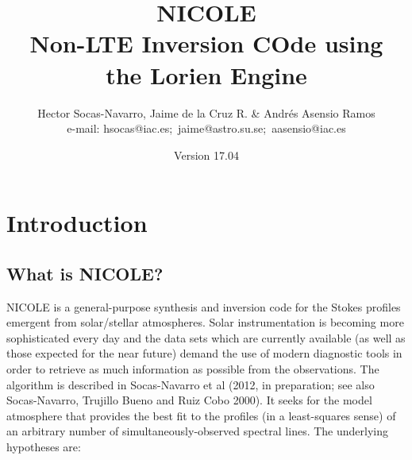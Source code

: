 

\title{NICOLE \\
Non-LTE Inversion COde using \\
the Lorien Engine}

\author{Hector Socas-Navarro,
    Jaime de la Cruz R. \& Andr\'es Asensio Ramos \\
%
e-mail: \mbox{hsocas@iac.es; jaime@astro.su.se; aasensio@iac.es}\\
}

\date{Version 17.04}

\maketitle


\tableofcontents



\chapter{Introduction}
\section{What is NICOLE?}

NICOLE is a general-purpose synthesis and inversion code for the
Stokes profiles emergent from solar/stellar atmospheres.  Solar
instrumentation is becoming more sophisticated every day and the data
sets which are currently available (as well as those expected for the
near future) demand the use of modern diagnostic tools in order to
retrieve as much information as possible from the observations.  The
algorithm is described in Socas-Navarro et al (2012, in preparation;
see also Socas-Navarro, Trujillo Bueno and Ruiz Cobo 2000). It seeks
for the model atmosphere that provides the best fit to the profiles
(in a least-squares sense) of an arbitrary number of
simultaneously-observed spectral lines.  The underlying hypotheses
are:

